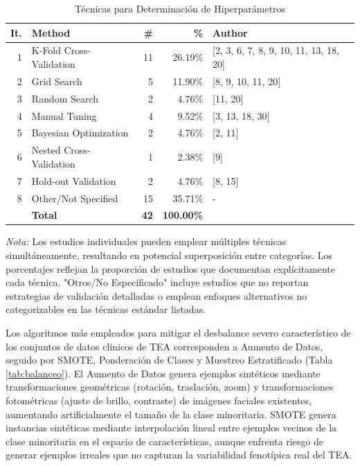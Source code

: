 \documentclass{ieeeaccess}
\begin{document}
	\begin{table}[htbp]
		\caption{Técnicas para Determinación de Hiperparámetros}
		\label{tab:hiperparametros}
		\centering
		\footnotesize
		\begin{tabular}{|r|p{60pt}|r|r|p{70pt}|}
			\hline
			\textbf{It.} & \textbf{Method} & \textbf{\#} & \textbf{\%} & \textbf{Author} \\
			\hline
			1 & K-Fold Cross-Validation & 11 & 26.19\% & [2, 3, 6, 7, 8, 9, 10, 11, 13, 18, 20] \\
			2 & Grid Search & 5 & 11.90\% & [8, 9, 10, 11, 20] \\
			3 & Random Search & 2 & 4.76\% & [11, 20] \\
			4 & Manual Tuning & 4 & 9.52\% & [3, 13, 18, 30] \\
			5 & Bayesian Optimization & 2 & 4.76\% & [2, 11] \\
			6 & Nested Cross-Validation & 1 & 2.38\% & [9] \\
			7 & Hold-out Validation & 2 & 4.76\% & [8, 15] \\
			8 & Other/Not Specified & 15 & 35.71\% & - \\
			\hline
			& \textbf{Total} & \textbf{42} & \textbf{100.00\%} & \\
			\hline
		\end{tabular}
		\begin{flushleft}
			\small \textit{Nota:} Los estudios individuales pueden emplear múltiples técnicas simultáneamente, resultando en potencial superposición entre categorías. Los porcentajes reflejan la proporción de estudios que documentan explícitamente cada técnica. "Otros/No Especificado" incluye estudios que no reportan estrategias de validación detalladas o emplean enfoques alternativos no categorizables en las técnicas estándar listadas.
		\end{flushleft}
	\end{table}
	
	Los algoritmos más empleados para mitigar el desbalance severo característico de los conjuntos de datos clínicos de TEA corresponden a Aumento de Datos, seguido por SMOTE, Ponderación de Clases y Muestreo Estratificado (Tabla \ref{tab:balanceo}). El Aumento de Datos genera ejemplos sintéticos mediante transformaciones geométricas (rotación, traslación, zoom) y transformaciones fotométricas (ajuste de brillo, contraste) de imágenes faciales existentes, aumentando artificialmente el tamaño de la clase minoritaria. SMOTE genera instancias sintéticas mediante interpolación lineal entre ejemplos vecinos de la clase minoritaria en el espacio de características, aunque enfrenta riesgo de generar ejemplos irreales que no capturan la variabilidad fenotípica real del TEA.
	
\end{document}
